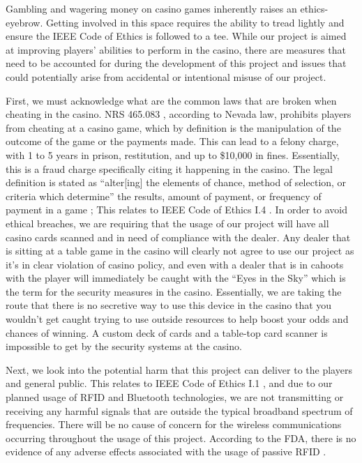 \documentclass[12pt]{article}
\begin{document}
Gambling and wagering money on casino games inherently raises an ethics-eyebrow. Getting involved in this space requires the ability to tread lightly and ensure the IEEE Code of Ethics \cite{IEEE_ethics} is followed to a tee. While our project is aimed at improving players' abilities to perform in the casino, there are measures that need to be accounted for during the development of this project and issues that could potentially arise from accidental or intentional misuse of our project. 

First, we must acknowledge what are the common laws that are broken when cheating in the casino. NRS 465.083 \cite{NRS}, according to Nevada law, prohibits players from cheating at a casino game, which by definition is the manipulation of the outcome of the game or the payments made. This can lead to a felony charge, with 1 to 5 years in prison, restitution, and up to \$10,000 in fines. Essentially, this is a fraud charge specifically citing it happening in the casino. The legal definition is stated as ``alter[ing] the elements of chance, method of selection, or criteria which determine'' the results, amount of payment, or frequency of payment in a game \cite{NRS}; This relates to IEEE Code of Ethics I.4 \cite{IEEE_ethics}. In order to avoid ethical breaches, we are requiring that the usage of our project will have all casino cards scanned and in need of compliance with the dealer. Any dealer that is sitting at a table game in the casino will clearly not agree to use our project as it's in clear violation of casino policy, and even with a dealer that is in cahoots with the player will immediately be caught with the ``Eyes in the Sky'' which is the term for the security measures in the casino. Essentially, we are taking the route that there is no secretive way to use this device in the casino that you wouldn't get caught trying to use outside resources to help boost your odds and chances of winning. A custom deck of cards and a table-top card scanner is impossible to get by the security systems at the casino. 

Next, we look into the potential harm that this project can deliver to the players and general public. This relates to IEEE Code of Ethics I.1 \cite{IEEE_ethics}, and due to our planned usage of RFID and Bluetooth technologies, we are not transmitting or receiving any harmful signals that are outside the typical broadband spectrum of frequencies. There will be no cause of concern for the wireless communications occurring throughout the usage of this project. According to the FDA, there is no evidence of any adverse effects associated with the usage of passive RFID \cite{FDA_RFID}.
\end{document}
